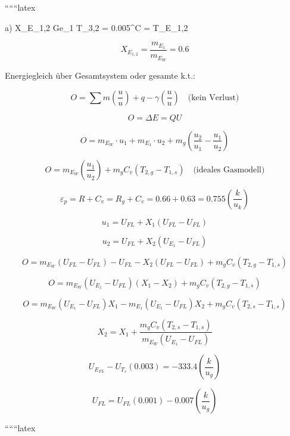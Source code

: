 ``````latex


a) \quad X_{E_{1,2}} \quad Ge_{1} \quad T_{3,2} = 0.005^\circ C = T_{E_{1,2}}

\[
X_{E_{1,2}} = \frac{m_{E_{1}}}{m_{E_{W}}} = 0.6
\]

Energiegleich über Gesamtsystem oder gesamte k.t.:

\[
O = \sum m \left( \frac{u}{u} \right) + q - \gamma \left( \frac{u}{u} \right) \quad \text{(kein Verlust)}
\]

\[
O = \Delta E = Q U
\]

\[
O = m_{E_{W}} \cdot u_{1} + m_{E_{1}} \cdot u_{2} + m_{g} \left( \frac{u_{2}}{u_{1}} - \frac{u_{1}}{u_{2}} \right)
\]

\[
O = m_{E_{W}} \left( \frac{u_{1}}{u_{2}} \right) + m_{g} C_{v} \left( T_{2,g} - T_{1,s} \right) \quad \text{(ideales Gasmodell)}
\]

\[
\varepsilon_{p} = R + C_{v} = R_{g} + C_{v} = 0.66 + 0.63 = 0.755 \left( \frac{k}{u_{k}} \right)
\]

\[
u_{1} = U_{FL} + X_{1} \left( U_{FL} - U_{FL} \right)
\]

\[
u_{2} = U_{FL} + X_{2} \left( U_{E_{1}} - U_{FL} \right)
\]

\[
O = m_{E_{W}} \left( U_{FL} - U_{FL} \right) - U_{FL} - X_{2} \left( U_{FL} - U_{FL} \right) + m_{g} C_{v} \left( T_{2,g} - T_{1,s} \right)
\]

\[
O = m_{E_{W}} \left( U_{E_{1}} - U_{FL} \right) \left( X_{1} - X_{2} \right) + m_{g} C_{v} \left( T_{2,g} - T_{1,s} \right)
\]

\[
O = m_{E_{W}} \left( U_{E_{1}} - U_{FL} \right) X_{1} - m_{E_{1}} \left( U_{E_{1}} - U_{FL} \right) X_{2} + m_{g} C_{v} \left( T_{2,s} - T_{1,s} \right)
\]

\[
X_{2} = X_{1} + \frac{m_{g} C_{v} \left( T_{2,s} - T_{1,s} \right)}{m_{E_{W}} \left( U_{E_{1}} - U_{FL} \right)}
\]

\[
U_{E_{FL}} - U_{T_{s}} \left( 0.003 \right) = -333.4 \left( \frac{k}{u_{g}} \right)
\]

\[
U_{FL} = U_{FL} \left( 0.001 \right) - 0.007 \left( \frac{k}{u_{g}} \right)
\]

``````latex


